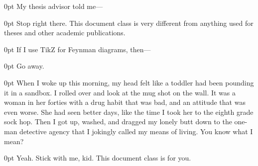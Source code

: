\documentclass{novel} %
\begin{document}
\begin{adjustwidth}{\parindent}{0pt}
\backindent{}My thesis advisor told me---
\end{adjustwidth}
\begin{adjustwidth}{\parindent}{0pt}
\backindent{}Stop right there. This document class is very different from
anything used for theses and other academic publications.
\end{adjustwidth}

\begin{adjustwidth}{\parindent}{0pt}
\backindent{}If I use TikZ for Feynman diagrams, then---
\end{adjustwidth}
\begin{adjustwidth}{\parindent}{0pt}
\backindent{}Go away.
\end{adjustwidth}

\begin{adjustwidth}{\parindent}{0pt}
\backindent{}When I woke up this morning, my head felt like a toddler had
been pounding it in a sandbox. I rolled over and look at the mug shot
on the wall. It was a woman in her forties with a drug habit that
was bad, and an attitude that was even worse. She had seen better
days, like the time I took her to the eighth grade sock hop. Then I
got up, washed, and dragged my lonely butt down to the one-man
detective agency that I jokingly called my means of living.
You know what I mean?
\end{adjustwidth}
\begin{adjustwidth}{\parindent}{0pt}
\backindent{}Yeah. Stick with me, kid. This document class is for you.
\end{adjustwidth}
\end{document}
